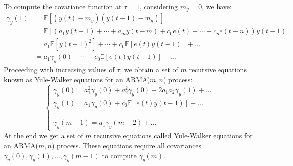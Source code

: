 To compute the covariance function at $\tau=1$, considering $m_y=0$, we have:
\begin{align*}
    \gamma_y(1) &=\mathbb{E}\left[ \left(y(t)-m_y\right)\left(y(t-1)-m_y\right) \right] \\
                &=\mathbb{E}\left[ \left(a_1y(t-1)+\cdots+a_m y(t-m)+c_0e(t)+\cdots+c_n e(t-n)\right)y(t-1) \right] \\
                &=a_1\mathbb{E}\left[{y(t-1)}^2\right]+\cdots+c_0\mathbb{E}\left[e(t)y(t-1)\right]+\dots \\
                &=a_1\gamma_y(0)+\cdots+c_0\mathbb{E}\left[e(t)y(t-1)\right]+\dots
\end{align*}
Proceeding with increasing values of $\tau$, we obtain a set of $m$ recursive equations known as Yule-Walker equations for an ARMA($m,n$) process:
\[\begin{cases}
    \gamma_y(0)=a_1^2\gamma_y(0) +a_2^2\gamma_y(0) +2a_1a_2\gamma_y(1) +\dots \\
    \gamma_y(1)=a_1\gamma_y(0) +c_0\mathbb{E}\left[e(t)y(t-1)\right] +\dots \\
    \vdots \\
    \gamma_y(m-1)=a_1\gamma_y(m-2)+\dots
\end{cases}\]
At the end we get a set of $m$ recursive equations called Yule-Walker equations for an ARMA($m,n$) process.
These equations require all covariances $\gamma_y(0),\gamma_y(1),\dots,\gamma_y(m-1)$ to compute $\gamma_y(m)$.